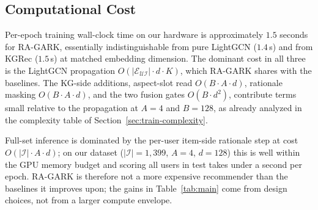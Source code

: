 \subsection{Computational Cost}
\label{sec:eval-cost}

Per-epoch training wall-clock time on our hardware is approximately $1.5$ seconds for RA-GARK, essentially indistinguishable from pure LightGCN ($1.4$\,s) and from KGRec ($1.5$\,s) at matched embedding dimension. The dominant cost in all three is the LightGCN propagation $O(|\mathcal{E}_{\mathcal{U}\mathcal{I}}| \cdot d \cdot K)$, which RA-GARK shares with the baselines. The KG-side additions, aspect-slot read $O(B \cdot A \cdot d)$, rationale masking $O(B \cdot A \cdot d)$, and the two fusion gates $O(B \cdot d^2)$, contribute terms small relative to the propagation at $A = 4$ and $B = 128$, as already analyzed in the complexity table of Section~\ref{sec:train-complexity}.

Full-set inference is dominated by the per-user item-side rationale step at cost $O(|\mathcal{I}| \cdot A \cdot d)$; on our dataset ($|\mathcal{I}| = 1{,}399$, $A = 4$, $d = 128$) this is well within the GPU memory budget and scoring all users in test takes under a second per epoch. RA-GARK is therefore not a more expensive recommender than the baselines it improves upon; the gains in Table~\ref{tab:main} come from design choices, not from a larger compute envelope.
